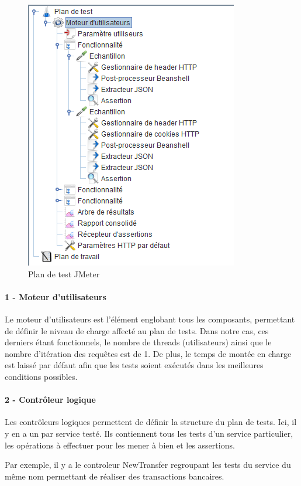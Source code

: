 	\begin{figure}[h!]
		\includegraphics[scale=0.7]{images/travailNeuflizeOBC/testsFonc/jmeterPlanTest.png}
		\centering
		\caption{Plan de test JMeter}
		\label{jmeterPlanTest}
	\end{figure}
	
	\paragraph{1 - Moteur d'utilisateurs}
	Le moteur d'utilisateurs est l'élément englobant tous les composants, permettant de définir le niveau de charge affecté au plan de tests. Dans notre cas, ces derniers étant fonctionnels, le nombre de threads (utilisateurs) ainsi que le nombre d'itération des requêtes est de 1. De plus, le temps de montée en charge est laissé par défaut afin que les tests soient exécutés dans les meilleures conditions possibles.

	\paragraph{2 - Contrôleur logique}
	Les contrôleurs logiques permettent de définir la structure du plan de tests. Ici, il y en a un par service testé. Ils contiennent tous les tests d'un service particulier, les opérations à effectuer pour les mener à bien et les assertions.
	
	Par exemple, il y a le controleur NewTransfer regroupant les tests du service du même nom permettant de réaliser des transactions bancaires.
	
